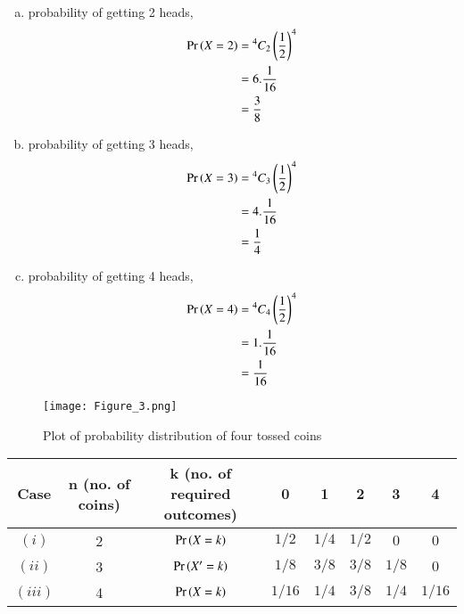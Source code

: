 \documentclass[journal,12pt,twocolumn]{IEEEtran}
\begin{document}
\begin{enumerate}[(i)]
\begin{enumerate}[(a)]
    \item probability of getting 2 heads,
        \begin{align}
            \begin{split}
                \Pr\left(X=2\right) &= {^4C_2}\left(\frac{1}{2}\right)^4\\
                &=6.\frac{1}{16}\\
                &=\frac{3}{8}
            \end{split}
        \end{align}

    \item probability of getting 3 heads,
        \begin{align}
            \begin{split}
                \Pr\left(X=3\right) &= {^4C_3}\left(\frac{1}{2}\right)^4\\
                &=4.\frac{1}{16}\\
                &=\frac{1}{4}
            \end{split}
        \end{align}

\item probability of getting 4 heads,
        \begin{align}
            \begin{split}
                \Pr\left(X=4\right) &= {^4C_4}\left(\frac{1}{2}\right)^4\\
                &=1.\frac{1}{16}\\
                &=\frac{1}{16}
            \end{split}
        \end{align}
\end{enumerate}

\begin{figure}[h!]
    \centering
    \texttt{[image: Figure\_3.png]}
    \caption{Plot of probability distribution of four tossed coins}
    \label{fig:Four coins}
\end{figure}
\end{enumerate}

\newpage
\begin{tabular}{|c|c|c|c|c|c|c|c|}
    \hline
    Case &  n (no. of coins) & k (no. of required outcomes) & 0 & 1 & 2 & 3 & 4\\
    \hline
    $(i)$ & 2 & $\Pr\left(X=k\right)$ & $1/2$& $1/4$ & $1/2$ & $0$ & $0$\\
    \hline
    $(ii)$ & 3 & $\Pr\left(X'=k\right)$ & $1/8$ & $3/8$ & $3/8$ & $1/8$ & $0$\\
    \hline
    $(iii)$ & 4 & $\Pr\left(X=k\right)$ & $1/16$& $1/4$ & $3/8$ & $1/4$ & $1/16$\\
    \hline
\end{tabular}
\end{document}
